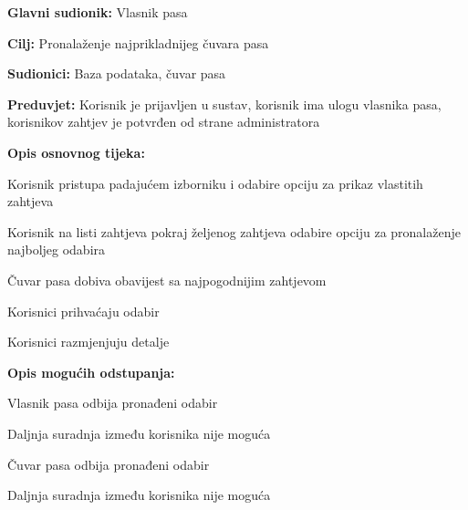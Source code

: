 					\noindent {}
					\begin{packed_item}
						
						\item \textbf{Glavni sudionik: } Vlasnik pasa
						\item  \textbf{Cilj:} Pronalaženje najprikladnijeg čuvara pasa
						\item  \textbf{Sudionici:} Baza podataka, čuvar pasa
						\item  \textbf{Preduvjet:} Korisnik je prijavljen u sustav, korisnik ima ulogu vlasnika pasa, korisnikov zahtjev je potvrđen od strane administratora
						\item  \textbf{Opis osnovnog tijeka:}
						
						\item[] \begin{packed_enum}
							
							\item Korisnik pristupa padajućem izborniku i odabire opciju za prikaz vlastitih zahtjeva   
							\item Korisnik na listi zahtjeva pokraj željenog zahtjeva odabire opciju za pronalaženje najboljeg odabira 
							\item Čuvar pasa dobiva obavijest sa najpogodnijim zahtjevom
							\item Korisnici prihvaćaju odabir
							\item Korisnici razmjenjuju detalje
							
						\end{packed_enum}
					
						\item  \textbf{Opis mogućih odstupanja:}
			
							\item[] \begin{packed_item}
							\item[4.a] Vlasnik pasa odbija pronađeni odabir
							\item[] \begin{packed_enum}
			
								\item Daljnja suradnja između korisnika nije moguća
			
							\end{packed_enum}
						
							\item[4.b] Čuvar pasa odbija pronađeni odabir
							\item[] \begin{packed_enum}
								
								\item Daljnja suradnja između korisnika nije moguća
								
							\end{packed_enum}
						\end{packed_item}
					\end{packed_item}	
				
